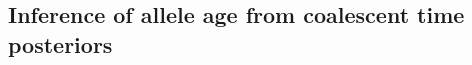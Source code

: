 %
%






%
\subsection{Inference of allele age from coalescent time posteriors}\label{sec:comp_post_method}
%

